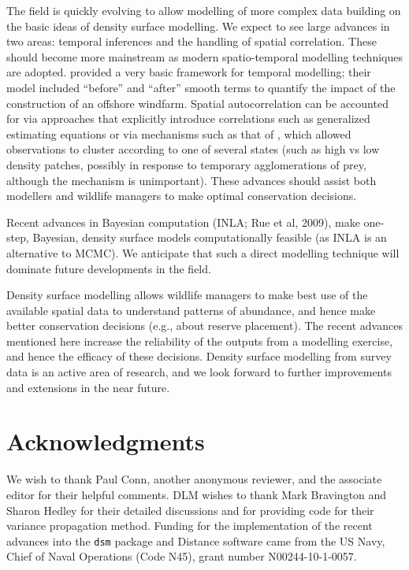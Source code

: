 \documentclass[a4paper,12pt]{article}
\begin{document}
The field is quickly evolving to allow modelling of more complex data building on the basic ideas of density surface modelling. We expect to see large advances in two areas: temporal inferences and the handling of spatial correlation. These should become more mainstream as modern spatio-temporal modelling techniques are adopted. \cite{Petersen:2011vy} provided a very basic framework for temporal modelling; their model included ``before'' and ``after'' smooth terms to quantify the impact of the construction of an offshore windfarm. Spatial autocorrelation can be accounted for via approaches that explicitly introduce correlations such as generalized estimating equations \cite[GEEs;][]{Hardin:2003uf} or via mechanisms such as that of \cite{Skaug:2006gs},  which allowed observations to cluster according to one of several states (such as high vs low density patches, possibly in response to temporary agglomerations of prey, although the mechanism is unimportant). These advances should assist both modellers and wildlife managers to make optimal conservation decisions. 

Recent advances in Bayesian computation (INLA; Rue et al, 2009), make one-step, Bayesian, density surface models computationally feasible (as INLA is an alternative to MCMC). We anticipate that such a direct modelling technique will dominate future developments in the field.

Density surface modelling allows wildlife managers to make best use of the available spatial data to understand patterns of abundance, and hence make better conservation decisions (e.g., about reserve placement). The recent advances mentioned here increase the reliability of the outputs from a modelling exercise, and hence the efficacy of these decisions.  Density surface modelling from survey data is an active area of research, and we look forward to further improvements and extensions in the near future.

\section*{Acknowledgments}

We wish to thank Paul Conn, another anonymous reviewer, and the associate editor for their helpful comments. DLM wishes to thank Mark Bravington and Sharon Hedley for their detailed discussions and for providing code for their variance propagation method. Funding for the implementation of the recent advances into the \texttt{dsm} package and Distance software came from the US Navy, Chief of Naval Operations (Code N45), grant number N00244-10-1-0057.
\end{document}
